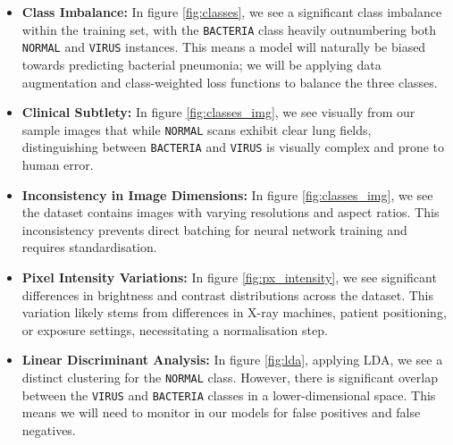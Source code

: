 \documentclass{article}
\begin{document}
\begin{itemize}
    \item \textbf{Class Imbalance:} In figure \ref{fig:classes}, we see a significant class imbalance within the training set, with the \texttt{BACTERIA} class heavily outnumbering both \texttt{NORMAL} and \texttt{VIRUS} instances. This means a model will naturally be biased towards predicting bacterial pneumonia; we will be applying data augmentation and class-weighted loss functions to balance the three classes.
    \item \textbf{Clinical Subtlety:} In figure \ref{fig:classes_img}, we see visually from our sample images that while \texttt{NORMAL} scans exhibit clear lung fields, distinguishing between \texttt{BACTERIA} and \texttt{VIRUS} is visually complex and prone to human error.
    \item \textbf{Inconsistency in Image Dimensions:} In figure \ref{fig:classes_img}, we see the dataset contains images with varying resolutions and aspect ratios. This inconsistency prevents direct batching for neural network training and requires standardisation.
    \item \textbf{Pixel Intensity Variations:} In figure \ref{fig:px_intensity}, we see significant differences in brightness and contrast distributions across the dataset. This variation likely stems from differences in X-ray machines, patient positioning, or exposure settings, necessitating a normalisation step.
    \item \textbf{Linear Discriminant Analysis:} In figure \ref{fig:lda}, applying LDA, we see a distinct clustering for the \texttt{NORMAL} class. However, there is significant overlap between the \texttt{VIRUS} and \texttt{BACTERIA} classes in a lower-dimensional space. This means we will need to monitor in our models for false positives and false negatives.
\end{itemize}
\end{document}

